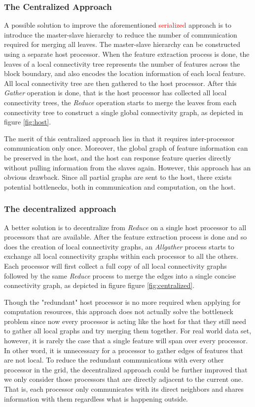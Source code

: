 \documentclass[10pt, conference, compsocconf]{IEEEtran}
\begin{document}
\subsubsection{The Centralized Approach}

A possible solution to improve the aforementioned \textcolor{red}{serialized} approach is to introduce the master-slave hierarchy to reduce the number of communication required for merging all leaves. The master-slave hierarchy can be constructed using a separate host processor. When the feature extraction process is done, the leaves of a local connectivity tree represents the number of features across the block boundary, and also encodes the location information of each local feature. All local connectivity tree are then gathered to the host processor. After this \emph{Gather} operation is done, that is the host processor has collected all local connectivity trees, the \emph{Reduce} operation starts to merge the leaves from each connectivity tree to construct a single global connectivity graph, as depicted in figure \ref{fig:host}.

The merit of this centralized approach lies in that it requires inter-processor communication only once. Moreover, the global graph of feature information can be preserved in the host, and the host can response feature queries directly without pulling information from the slaves again. However, this approach has an obvious drawback. Since all partial graphs are sent to the host, there exists potential bottlenecks, both in communication and computation, on the host.  

\subsubsection{The decentralized approach}

A better solution is to decentralize from \emph{Reduce} on a single host processor to all processors that are available. After the feature extraction process is done and so does the creation of local connectivity graphs, an \emph{Allgather} process starts to exchange all local connectivity graphs within each processor to all the others. Each processor will first collect a full copy of all local connectivity graphs followed by the same \emph{Reduce} process to merge the edges into a single concise connectivity graph, as depicted in figure figure \ref{fig:centralized}.

Though the "redundant" host processor is no more required when applying for computation resources, this approach does not actually solve the bottleneck problem since now every processor is acting like the host for that they still need to gather all local graphs and try merging them together. For real world data set, however, it is rarely the case that a single feature will span over every processor. In other word, it is unnecessary for a processor to gather edges of features that are not local. To reduce the redundant communications with every other processor in the grid, the decentralized approach could be further improved that we only consider those processors that are directly adjacent to the current one. That is, each processor only communicates with its direct neighbors and shares information with them regardless what is happening outside.
\end{document}
